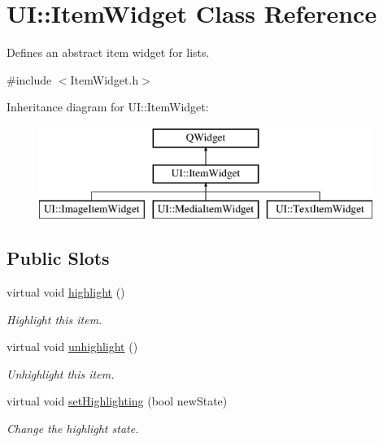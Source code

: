 \hypertarget{class_u_i_1_1_item_widget}{\section{U\-I\-:\-:Item\-Widget Class Reference}
\label{class_u_i_1_1_item_widget}
}


Defines an abstract item widget for lists.  




{\ttfamily \#include $<$Item\-Widget.\-h$>$}

Inheritance diagram for U\-I\-:\-:Item\-Widget\-:\begin{figure}[H]
\begin{center}
\leavevmode
\includegraphics[height=3.000000cm]{class_u_i_1_1_item_widget}
\end{center}
\end{figure}
\subsection*{Public Slots}
\begin{DoxyCompactItemize}
\item 
virtual void \hyperlink{class_u_i_1_1_item_widget_a77696f5ab930ffa43e1119997b448a26}{highlight} ()
\begin{DoxyCompactList}\small\item\em Highlight this item. \end{DoxyCompactList}\item 
virtual void \hyperlink{class_u_i_1_1_item_widget_a0bf303428b8bccafd61fc2e92161a2ff}{unhighlight} ()
\begin{DoxyCompactList}\small\item\em Unhighlight this item. \end{DoxyCompactList}\item 
virtual void \hyperlink{class_u_i_1_1_item_widget_ad7b05bf5836def2b4053331c02104bae}{set\-Highlighting} (bool new\-State)
\begin{DoxyCompactList}\small\item\em Change the highlight state. \end{DoxyCompactList}\end{DoxyCompactItemize}

